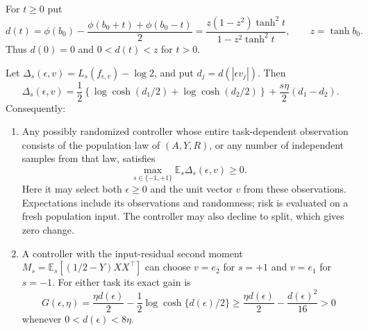 For $t\ge0$ put
\begin{equation}
 d(t)=\phi(b_0)-\frac{\phi(b_0+t)+\phi(b_0-t)}2
 =\frac{z(1-z^2)\tanh^2t}{1-z^2\tanh^2t},\qquad z=\tanh b_0.
 \label{eq:axis-d}
\end{equation}
Thus $d(0)=0$ and $0<d(t)<z$ for $t>0$.

\begin{theorem}
\label{thm:axis-observation}
Let $\Delta_s(\epsilon,v)=L_s(f_{\epsilon,v})-\log2$, and put
$d_j=d(|\epsilon v_j|)$. Then
\begin{equation}
 \Delta_s(\epsilon,v)
 =\frac12\left\{\log\cosh(d_1/2)+\log\cosh(d_2/2)\right\}
   +\frac{s\eta}{2}(d_1-d_2).
 \label{eq:axis-risk}
\end{equation}
Consequently:
\begin{enumerate}
\item Any possibly randomized controller whose entire task-dependent
observation consists of the population law of $(A,Y,R)$, or any number
of independent samples from that law, satisfies
\[
 \max_{s\in\{-1,+1\}}\mathbb E_s
       \Delta_s(\epsilon,v)\ge0.
\]
Here it may select both $\epsilon\ge0$ and the unit vector $v$ from
these observations. Expectations include its observations and randomness;
risk is evaluated on a fresh population input. The controller may also
decline to split, which gives zero change.
\item A controller with the input-residual second moment
$M_s=\mathbb E_s[(1/2-Y)XX^\top]$ can choose $v=e_2$ for $s=+1$
and $v=e_1$ for $s=-1$. For either task its exact gain is
\begin{equation}
 G(\epsilon,\eta)
 =\frac{\eta d(\epsilon)}2
  -\frac12\log\cosh\{d(\epsilon)/2\}
 \ge\frac{\eta d(\epsilon)}2-\frac{d(\epsilon)^2}{16}>0
 \label{eq:axis-gain}
\end{equation}
whenever $0<d(\epsilon)<8\eta$.
\end{enumerate}
\end{theorem}
